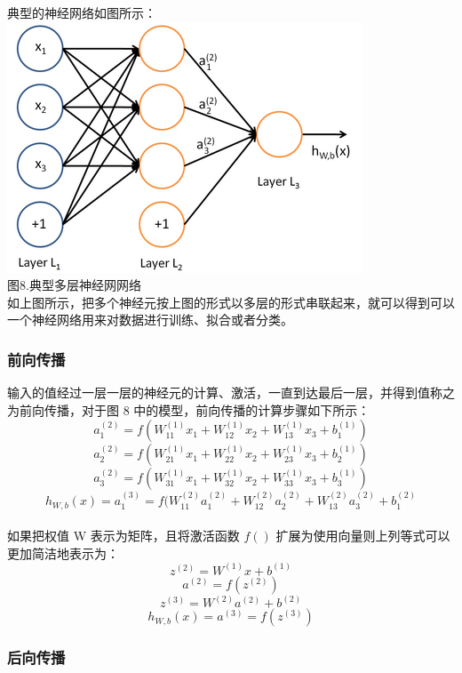 典型的神经网络如图所示：\\\includegraphics{picture/MLP.png}\\图8.典型多层神经网网络\\如上图所示，把多个神经元按上图的形式以多层的形式串联起来，就可以得到可以一个神经网络用来对数据进行训练、拟合或者分类。

\subsubsection{前向传播}\label{ux524dux5411ux4f20ux64ad}

输入的值经过一层一层的神经元的计算、激活，一直到达最后一层，并得到值称之为前向传播，对于图
8
中的模型，前向传播的计算步骤如下所示：\\\[ a_1^{(2)} = f(W_{11}^{(1)}x_1 + W_{12}^{(1)} x_2 + W_{13}^{(1)} x_3 + b_1^{(1)})\]
\[ a_2^{(2)} = f(W_{21}^{(1)}x_1 + W_{22}^{(1)} x_2 + W_{23}^{(1)} x_3 + b_2^{(1)})\]
\[ a_3^{(2)} = f(W_{31}^{(1)}x_1 + W_{32}^{(1)} x_2 + W_{33}^{(1)} x_3 + b_3^{(1)})\]
\[ h_{W,b}(x) = a_1^{(3)} =  f(W_{11}^{(2)}a_1^{(2)} + W_{12}^{(2)} a_2^{(2)} + W_{13}^{(2)} a_3^{(2)} + b_1^{(2)}\]\\如果把权值
W 表示为矩阵，且将激活函数 \(f()\)
扩展为使用向量则上列等式可以更加简洁地表示为：\\\[z^{(2)} = W^{(1)}x + b^{(1)}\]
\[a^{(2)} = f(z^{(2)})\] \[z^{(3)} = W^{(2)} a^{(2)} + b^{(2)}\]
\[h_{W,b}(x) = a^{(3)} = f(z^{(3)})\]

\subsubsection{后向传播}\label{ux540eux5411ux4f20ux64ad}

